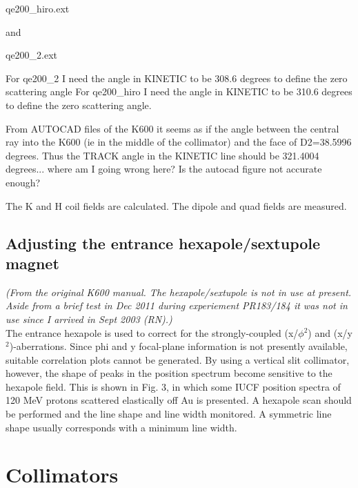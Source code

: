 \documentclass[11pt]{report}
\begin{document}
qe200\_hiro.ext

and 

qe200\_2.ext

For qe200\_2 I need the angle in KINETIC to be 308.6 degrees to define
the zero scattering angle
For qe200\_hiro I need the angle in KINETIC to be 310.6 degrees to
define the zero scattering angle.  

From AUTOCAD files of the K600 it seems as if the angle between
the central ray into the K600 (ie in the middle of the collimator)
and the face of D2=38.5996 degrees.
Thus the TRACK angle in the KINETIC line should be 321.4004 degrees...
where am I going wrong here?
Is the autocad figure not accurate enough?

The K and H coil fields are calculated.
The dipole and quad fields are measured.




\section{Adjusting the entrance hexapole/sextupole magnet}

{\it (From the original K600 manual.
The hexapole/sextupole is not in use at present.
Aside from a brief test in Dec 2011 during experiement PR183/184
it was not in use since I arrived in Sept 2003 (RN).)}\\

The entrance hexapole is used to correct for the strongly-coupled 
(x/$\phi$$^2$) and (x/y$^2$)-aberrations.  Since phi and y focal-plane information is not
presently available, suitable correlation plots cannot be generated.  By using
a vertical slit collimator, however, the shape of peaks in the position 
spectrum become sensitive to the hexapole field.  This is shown in Fig. 3, 
in which some IUCF position spectra of 120 MeV protons scattered elastically
off Au is presented.  A hexapole scan should be performed and the line shape
and line width monitored.  A symmetric line shape usually corresponds with a
minimum line width.









\chapter{Collimators}\label{chap:collimators}
\end{document}
